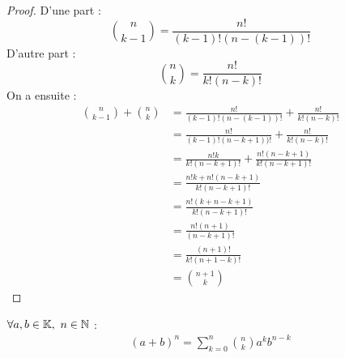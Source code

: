 \begin{proof}
	D'une part :
	\[ \binom{n}{k - 1} = \frac{n!}{(k-1)!(n - (k - 1))!} \]
	D'autre part :
	\[ \binom{n}{k} = \frac{n!}{k!(n - k)!} \]
	On a ensuite : 
	\begin{align*}
		\binom{n}{k - 1} + \binom{n}{k} &= 
		\frac{n!}{(k-1)!(n - (k - 1))!} + \frac{n!}{k!(n - k)!} \\
		&= \frac{n!}{(k-1)!(n - k + 1))!} + \frac{n!}{k!(n - k)!} \\
		&= \frac{n!k}{k!(n-k+1)!} + \frac{n!(n-k+1)}{k!(n-k+1)!} \\
		&= \frac{n!k + n!(n - k + 1)}{k!(n - k + 1)!} \\
		&= \frac{n!(k + n - k + 1)}{k!(n - k + 1)!} \\
		&= \frac{n!(n+1)}{(n - k + 1)!} \\
		&= \frac{(n+1)!}{k!(n + 1 - k)!} \\
		&= \binom{n+1}{k}
	\end{align*}
\end{proof}
	
\begin{proposition}
	$\forall a, b \in \mathbb{K},\ n \in \mathbb{N}$ :
	\begin{align*}
		(a + b)^n = \sum_{k = 0}^{n} \binom{n}{k} a^kb^{n-k}
	\end{align*}
\end{proposition}

